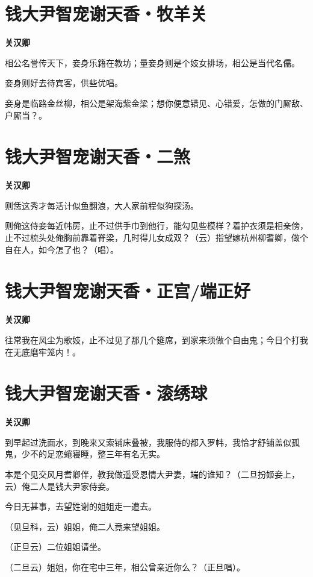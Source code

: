 \documentclass[12pt,a4paper]{ctexbook}
\begin{document}
\section{钱大尹智宠谢天香・牧羊关}
\textbf{关汉卿}\par\vspace{0.5em}
相公名誉传天下，妾身乐籍在教坊；量妾身则是个妓女排场，相公是当代名儒。\par
妾身则好去待宾客，供些优唱。\par
妾身是临路金丝柳，相公是架海紫金梁；想你便意错见、心错爱，怎做的门厮敌、户厮当？。\par

\section{钱大尹智宠谢天香・二煞}
\textbf{关汉卿}\par\vspace{0.5em}
则恁这秀才每活计似鱼翻浪，大人家前程似狗探汤。\par
则俺这侍妾每近帏房，止不过供手巾到他行，能勾见些模样？着护衣须是相亲傍，止不过梳头处俺胸前靠着脊梁，几时得儿女成双？（云）指望嫁杭州柳耆卿，做个自在人，如今怎了也？（唱）。\par

\section{钱大尹智宠谢天香・正宫/端正好}
\textbf{关汉卿}\par\vspace{0.5em}
往常我在风尘为歌妓，止不过见了那几个筵席，到家来须做个自由鬼；今日个打我在无底磨牢笼内！。\par

\section{钱大尹智宠谢天香・滚绣球}
\textbf{关汉卿}\par\vspace{0.5em}
到早起过洗面水，到晚来又索铺床叠被，我服侍的都入罗帏，我恰才舒铺盖似孤鬼，少不的足恋蜷寝睡，整三年有名无实。\par
本是个见交风月耆卿伴，教我做遥受恩情大尹妻，端的谁知？（二旦扮姬妾上，云）俺二人是钱大尹家侍妾。\par
今日无甚事，去望姓谢的姐姐走一遭去。\par
（见旦科，云）姐姐，俺二人竟来望姐姐。\par
（正旦云）二位姐姐请坐。\par
（二旦云）姐姐，你在宅中三年，相公曾亲近你么？（正旦唱）。\par
\end{document}
